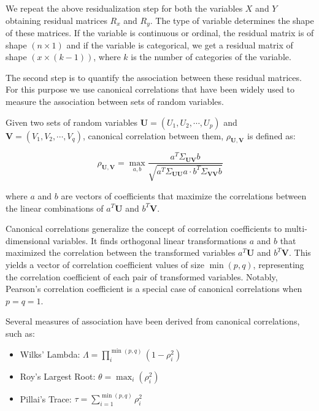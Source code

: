 We repeat the above residualization step for both the variables $ X $ and $ Y $
obtaining residual matrices $ R_x $ and $ R_y $. The type of variable determines
the shape of these matrices. If the variable is continuous or ordinal, the 
residual matrix is of shape $ (n \times 1 ) $ and if the variable is categorical,
we get a residual matrix of shape $ (x \times (k - 1)) $, where $ k $ is the number
of categories of the variable.

The second step is to quantify the association between these residual matrices.
For this purpose we use canonical correlations \citep{Hotelling1936} that have been widely used to
measure the association between sets of random variables.

\begin{definition}
	Given two sets of random variables $ \bm{U} = (U_1, U_2, \cdots, U_p) $
	and $ \bm{V} = (V_1, V_2, \cdots, V_q) $, canonical correlation between
	them, $\rho_{\bm{U}, \bm{V}} $ is defined as:
		
	\begin{equation}
		\rho_{\bm{U}, \bm{V}} = \max_{a, b} \frac{a^T \Sigma_{\bm{UV}} b}{\sqrt{a^T \Sigma_{\bm{UU}} a \cdot b^T \Sigma_{\bm{VV}} b}}
	\end{equation}

	where $ a $ and $ b $ are vectors of coefficients that maximize the correlations
	between the linear combinations of $ a^T \bm{U} $ and $ b^T \bm{V} $.
\end{definition}

Canonical correlations generalize the concept of correlation coefficients to
multi-dimensional variables. It finds orthogonal linear transformations $ a $
and $ b $ that maximized the correlation between the transformed variables $
a^T \bm{U} $ and $ b^T \bm{V} $. This yields a vector of correlation
coefficient values of size $ \min(p, q) $, representing the correlation
coefficient of each pair of transformed variables. Notably, Pearson's
correlation coefficient is a special case of canonical correlations when $ p =
q = 1 $.

Several measures of association have been derived from canonical correlations, such as:
\begin{itemize}
	\item Wilks' Lambda: $\Lambda = \prod_{i}^{\min(p, q)} (1 - \rho_i^2) $
	\item Roy's Largest Root: $ \theta = \max_i(\rho_i^2) $
	\item Pillai's Trace: $ \tau = \sum_{i=1}^{\min(p, q)} \rho_i^2 $
\end{itemize}

